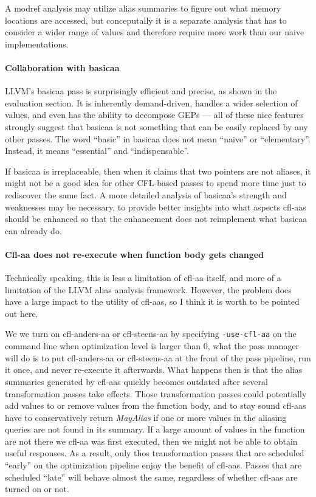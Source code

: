 \documentclass[10pt]{article}
\begin{document}
A modref analysis may utilize alias summaries to figure out what memory locations
are accessed, but conceputally it is a separate analysis that has to consider a
wider range of values and therefore require more work than our naive implementations.

\paragraph{Collaboration with basicaa}

LLVM's basicaa pass is surprisingly efficient and precise, as shown in the
evaluation section. It is inherently demand-driven, handles a wider selection of values, and even has the
ability to decompose GEPs --- all of these nice features strongly suggest that
basicaa is not something that can be easily replaced by any other passes. The word ``basic'' in
basicaa does not mean ``naive'' or ``elementary''. Instead, it means
``essential'' and ``indispensable''. 

If basicaa is irreplaceable, then when it claims that two pointers are not
aliases, it might not be a good idea for other CFL-based passes to spend more
time just to rediscover
the same fact. A more detailed analysis of
basicaa's strength and weaknesses may be necessary, to provide better insights
into what aspects cfl-aas should be enhanced so that the enhancement does not
reimplement what basicaa can already do.  

\paragraph{Cfl-aa does not re-execute when function body gets changed}

Technically speaking, this is less a limitation of cfl-aa itself, and more of a
limitation of the LLVM alias analysis framework. However, the problem does have
a large impact to the utility of cfl-aas, so I think it is worth to be
pointed out here.

We we turn on cfl-anders-aa or cfl-steens-aa by specifying \texttt{-use-cfl-aa}
on the command line when optimization level is larger than 0, what the pass
manager will do is to put cfl-anders-aa or cfl-steens-aa at the front of the
pass pipeline, run it once, and never re-execute it afterwards. What happens
then is that the alias summaries generated by cfl-aas quickly becomes outdated after
several transformation passes take effects. Those transformation passes could
potentially add values to or remove values from the function body, and to stay sound cfl-aas have to
conservatively return \emph{MayAlias} if one or more values in the aliasing
queries are not found in its summary. If a large amount of values in the
function are not there we cfl-aa was first executed, then we might not be able
to obtain useful responses. As a result, only thos transformation passes that are
scheduled ``early'' on the optimization pipeline enjoy the benefit of cfl-aas.
Passes that are scheduled ``late'' will behave almost the same, regardless
of whether cfl-aas are turned on or not.
\end{document}
